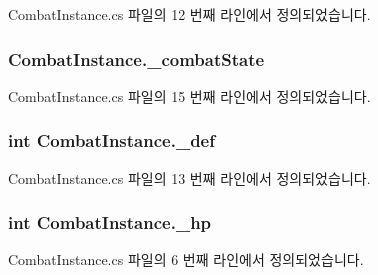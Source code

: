 Combat\+Instance.\+cs 파일의 12 번째 라인에서 정의되었습니다.

\subsubsection[{\texorpdfstring{\+\_\+combat\+State}{_combatState}}]{ Combat\+Instance.\+\_\+combat\+State\hspace{0.3cm}{\ttfamily [private]}}\hypertarget{class_combat_instance_a6352b66ef39484c9d76b03df56d26ee4}{}\label{class_combat_instance_a6352b66ef39484c9d76b03df56d26ee4}


Combat\+Instance.\+cs 파일의 15 번째 라인에서 정의되었습니다.

\subsubsection[{\texorpdfstring{\+\_\+def}{_def}}]{\setlength{\rightskip}{0pt plus 5cm}int Combat\+Instance.\+\_\+def\hspace{0.3cm}{\ttfamily [private]}}\hypertarget{class_combat_instance_a1c2bc3e91c7e2fee8b5d5f489eaa3d40}{}\label{class_combat_instance_a1c2bc3e91c7e2fee8b5d5f489eaa3d40}


Combat\+Instance.\+cs 파일의 13 번째 라인에서 정의되었습니다.

\subsubsection[{\texorpdfstring{\+\_\+hp}{_hp}}]{\setlength{\rightskip}{0pt plus 5cm}int Combat\+Instance.\+\_\+hp\hspace{0.3cm}{\ttfamily [private]}}\hypertarget{class_combat_instance_a392329b865aa88f2a579fcb7e7a0a99b}{}\label{class_combat_instance_a392329b865aa88f2a579fcb7e7a0a99b}


Combat\+Instance.\+cs 파일의 6 번째 라인에서 정의되었습니다.

